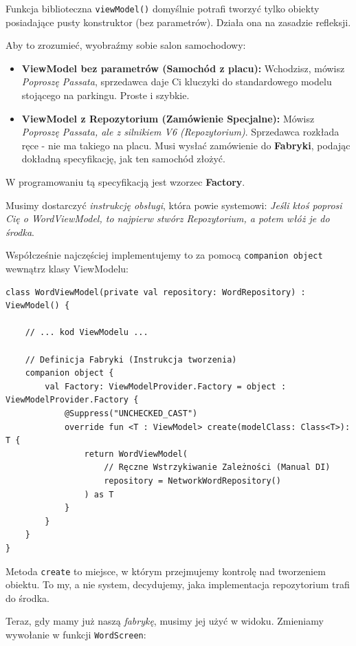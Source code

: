 Funkcja biblioteczna \texttt{viewModel()} domyślnie potrafi tworzyć tylko obiekty posiadające pusty konstruktor (bez parametrów). Działa ona na zasadzie refleksji.

Aby to zrozumieć, wyobraźmy sobie salon samochodowy:
\begin{itemize}
    \item \textbf{ViewModel bez parametrów (Samochód z placu):} Wchodzisz, mówisz \textit{Poproszę Passata}, sprzedawca daje Ci kluczyki do standardowego modelu stojącego na parkingu. Proste i szybkie.
    \item \textbf{ViewModel z Repozytorium (Zamówienie Specjalne):} Mówisz \textit{Poproszę Passata, ale z silnikiem V6 (Repozytorium)}. Sprzedawca rozkłada ręce - nie ma takiego na placu. Musi wysłać zamówienie do \textbf{Fabryki}, podając dokładną specyfikację, jak ten samochód złożyć.
\end{itemize}

W programowaniu tą specyfikacją jest wzorzec \textbf{Factory}.

Musimy dostarczyć \textit{instrukcję obsługi}, która powie systemowi: \textit{Jeśli ktoś poprosi Cię o WordViewModel, to najpierw stwórz Repozytorium, a potem włóż je do środka}.

Współcześnie najczęściej implementujemy to za pomocą \texttt{companion object} wewnątrz klasy ViewModelu:

\begin{verbatim}
class WordViewModel(private val repository: WordRepository) : ViewModel() {
    
    // ... kod ViewModelu ...

    // Definicja Fabryki (Instrukcja tworzenia)
    companion object {
        val Factory: ViewModelProvider.Factory = object : ViewModelProvider.Factory {
            @Suppress("UNCHECKED_CAST")
            override fun <T : ViewModel> create(modelClass: Class<T>): T {
                return WordViewModel(
                    // Ręczne Wstrzykiwanie Zależności (Manual DI)
                    repository = NetworkWordRepository()
                ) as T
            }
        }
    }
}
\end{verbatim}

Metoda \texttt{create} to miejsce, w którym przejmujemy kontrolę nad tworzeniem obiektu. To my, a nie system, decydujemy, jaka implementacja repozytorium trafi do środka.

Teraz, gdy mamy już naszą \textit{fabrykę}, musimy jej użyć w widoku. Zmieniamy wywołanie w funkcji \texttt{WordScreen}:

